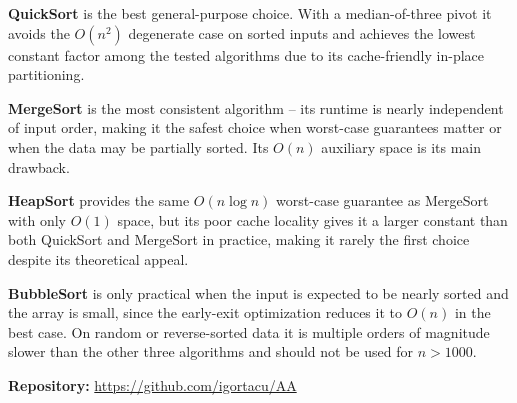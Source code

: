 \documentclass[12pt]{article}
\begin{document}
\textbf{QuickSort} is the best general-purpose choice. With a median-of-three pivot it
avoids the $O(n^2)$ degenerate case on sorted inputs and achieves the lowest constant factor
among the tested algorithms due to its cache-friendly in-place partitioning.

\textbf{MergeSort} is the most consistent algorithm -- its runtime is nearly independent of
input order, making it the safest choice when worst-case guarantees matter or when the data
may be partially sorted. Its $O(n)$ auxiliary space is its main drawback.

\textbf{HeapSort} provides the same $O(n \log n)$ worst-case guarantee as MergeSort with
only $O(1)$ space, but its poor cache locality gives it a larger constant than both QuickSort
and MergeSort in practice, making it rarely the first choice despite its theoretical appeal.

\textbf{BubbleSort} is only practical when the input is expected to be nearly sorted and the
array is small, since the early-exit optimization reduces it to $O(n)$ in the best case.
On random or reverse-sorted data it is multiple orders of magnitude slower than the other
three algorithms and should not be used for $n > 1000$.

\vspace{0.5cm}
\noindent\textbf{Repository:} \url{https://github.com/igortacu/AA}

\pagebreak
\end{document}

